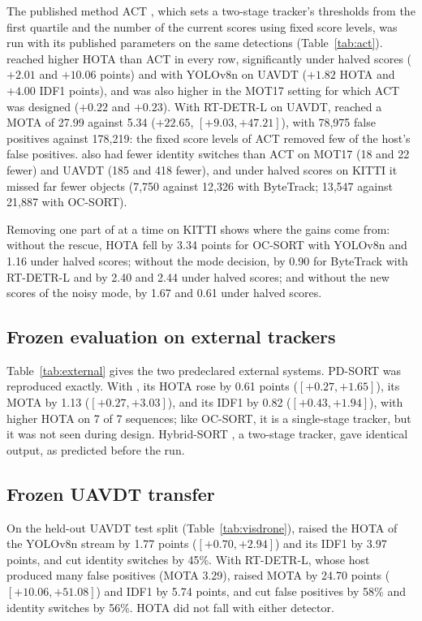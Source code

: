 The published method ACT \cite{act2026adaptive}, which sets a two-stage tracker's thresholds from
the first quartile and the number of the current scores using fixed score levels, was run with its
published parameters on the same detections (Table~\ref{tab:act}). \scl{} reached higher HOTA than
ACT in every row, significantly under halved scores ($+2.01$ and $+10.06$ points) and with YOLOv8n
on UAVDT ($+1.82$ HOTA and $+4.00$ IDF1 points), and was also higher in the MOT17 setting for which
ACT was designed ($+0.22$ and $+0.23$). With RT-DETR-L on UAVDT, \scl{} reached a MOTA of 27.99
against 5.34 ($+22.65$, $[+9.03,+47.21]$), with 78,975 false positives against 178,219: the fixed
score levels of ACT removed few of the host's false positives. \scl{} also had fewer identity switches
than ACT on MOT17 (18 and 22 fewer) and UAVDT (185 and 418 fewer), and under halved scores on KITTI
it missed far fewer objects (7,750 against 12,326 with ByteTrack; 13,547 against 21,887 with
OC-SORT).

Removing one part of \scl{} at a time on KITTI shows where the gains come from: without the rescue,
HOTA fell by
3.34 points for OC-SORT with YOLOv8n and 1.16 under halved scores; without the mode decision, by
0.90 for ByteTrack with RT-DETR-L and by 2.40 and 2.44 under halved scores; and without the new
scores of the noisy mode, by 1.67 and 0.61 under halved scores.


\subsection{Frozen evaluation on external trackers}\label{sec:external}

Table~\ref{tab:external} gives the two predeclared external systems. PD-SORT \cite{wang2025pdsort}
was reproduced exactly. With \scl{}, its HOTA rose by 0.61 points ($[+0.27,+1.65]$), its MOTA by
1.13 ($[+0.27,+3.03]$), and its IDF1 by 0.82 ($[+0.43,+1.94]$), with higher HOTA on 7 of 7
sequences; like OC-SORT, it is a single-stage tracker, but it was not seen during design.
Hybrid-SORT \cite{yang2024hybridsort}, a two-stage tracker, gave identical output, as predicted
before the run.


\subsection{Frozen UAVDT transfer}\label{sec:visdrone}

On the held-out UAVDT test split (Table~\ref{tab:visdrone}), \scl{} raised the HOTA of the YOLOv8n
stream by 1.77 points ($[+0.70,+2.94]$) and its IDF1 by 3.97 points, and cut identity switches by
45\%. With RT-DETR-L, whose host produced many false positives (MOTA 3.29), \scl{} raised MOTA by
24.70 points ($[+10.06,+51.08]$) and IDF1 by 5.74 points, and cut false positives by 58\% and
identity switches by 56\%. HOTA did not fall with either detector.

